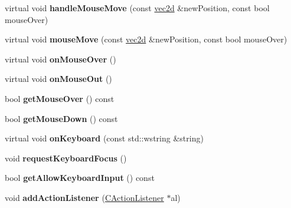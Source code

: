 \begin{DoxyCompactItemize}
\item 
\hypertarget{class_c_gui_panel_a810cd53278853b92512cbbc9106c6181}{
virtual void {\bfseries handleMouseMove} (const \hyperlink{classvec2d}{vec2d} \&newPosition, const bool mouseOver)}
\label{class_c_gui_panel_a810cd53278853b92512cbbc9106c6181}

\item 
\hypertarget{class_c_gui_panel_ae3918c038c1de7215d5cb58041cb30aa}{
virtual void {\bfseries mouseMove} (const \hyperlink{classvec2d}{vec2d} \&newPosition, const bool mouseOver)}
\label{class_c_gui_panel_ae3918c038c1de7215d5cb58041cb30aa}

\item 
\hypertarget{class_c_gui_panel_a9468fcd0c26c9d1e8e78649877561ee4}{
virtual void {\bfseries onMouseOver} ()}
\label{class_c_gui_panel_a9468fcd0c26c9d1e8e78649877561ee4}

\item 
\hypertarget{class_c_gui_panel_a9da328c676294e6937691ae164fe4d30}{
virtual void {\bfseries onMouseOut} ()}
\label{class_c_gui_panel_a9da328c676294e6937691ae164fe4d30}

\item 
\hypertarget{class_c_gui_panel_a6da86076a23b5faedc9200705a6ddd80}{
bool {\bfseries getMouseOver} () const }
\label{class_c_gui_panel_a6da86076a23b5faedc9200705a6ddd80}

\item 
\hypertarget{class_c_gui_panel_afeae68f13007349fd5f7dfaa887fa5ca}{
bool {\bfseries getMouseDown} () const }
\label{class_c_gui_panel_afeae68f13007349fd5f7dfaa887fa5ca}

\item 
\hypertarget{class_c_gui_panel_a03884ea74caa603c808cbb7ea047216c}{
virtual void {\bfseries onKeyboard} (const std::wstring \&string)}
\label{class_c_gui_panel_a03884ea74caa603c808cbb7ea047216c}

\item 
\hypertarget{class_c_gui_panel_a77f7a0deca61cb708eff255bdca0c64d}{
void {\bfseries requestKeyboardFocus} ()}
\label{class_c_gui_panel_a77f7a0deca61cb708eff255bdca0c64d}

\item 
\hypertarget{class_c_gui_panel_a82fd2b377f2ddc671b77725a4ec6d5f6}{
bool {\bfseries getAllowKeyboardInput} () const }
\label{class_c_gui_panel_a82fd2b377f2ddc671b77725a4ec6d5f6}

\item 
\hypertarget{class_c_gui_panel_aa5be67893e97fdaa90dd7560552a6b9f}{
void {\bfseries addActionListener} (\hyperlink{class_c_action_listener}{CActionListener} $\ast$al)}
\label{class_c_gui_panel_aa5be67893e97fdaa90dd7560552a6b9f}


\end{DoxyCompactItemize}
